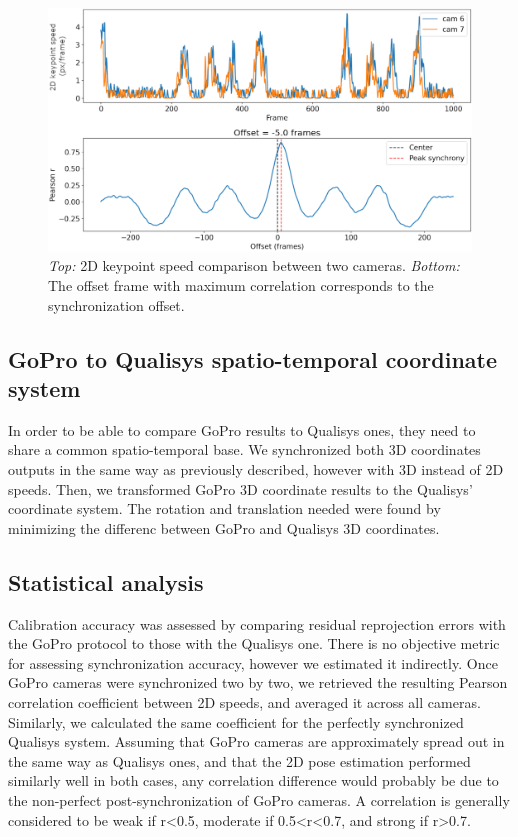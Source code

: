 \begin{figure}[!ht]
	\centering
	\def\svgwidth{1\columnwidth}
	\fontsize{10pt}{10pt}\selectfont
	\includegraphics[width=\linewidth]{"../Chap6/Figures/Fig_Sync.png"}
	\caption{\textit{Top:} 2D keypoint speed comparison between two cameras. \textit{Bottom:} The offset frame with maximum correlation corresponds to the synchronization offset.}
      \label{fig_sync}
\end{figure}


\FloatBarrier
\subsection{GoPro to Qualisys spatio-temporal coordinate system}

In order to be able to compare GoPro results to Qualisys ones, they need to share a common spatio-temporal base. We synchronized both 3D coordinates outputs in the same way as previously described, however with 3D instead of 2D speeds. Then, we transformed GoPro 3D coordinate results to the Qualisys' coordinate system. The rotation and translation needed were found by minimizing the differenc between GoPro and Qualisys 3D coordinates.


\subsection{Statistical analysis}

Calibration accuracy was assessed by comparing residual reprojection errors with the GoPro protocol to those with the Qualisys one. There is no objective metric for assessing synchronization accuracy, however we estimated it indirectly. Once GoPro cameras were synchronized two by two, we retrieved the resulting Pearson correlation coefficient between 2D speeds, and averaged it across all cameras. Similarly, we calculated the same coefficient for the perfectly synchronized Qualisys system. Assuming that GoPro cameras are approximately spread out in the same way as Qualisys ones, and that the 2D pose estimation performed similarly well in both cases, any correlation difference would probably be due to the non-perfect post-synchronization of GoPro cameras. A correlation is generally considered to be weak if r<0.5, moderate if 0.5<r<0.7, and strong if r>0.7.

